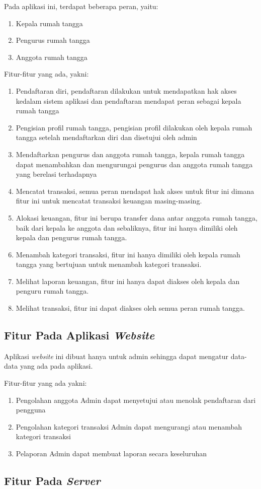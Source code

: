 \hspace{0,5cm}Pada aplikasi ini, terdapat beberapa peran, yaitu:
\begin{enumerate}
	\item Kepala rumah tangga
	\item	Pengurus rumah tangga
	\item Anggota rumah tangga
\end{enumerate}

Fitur-fitur yang ada, yakni:
\begin{enumerate}
	\item Pendaftaran diri, pendaftaran dilakukan untuk mendapatkan hak akses kedalam sistem aplikasi dan pendaftaran mendapat peran sebagai kepala rumah tangga
	\item Pengisian profil rumah tangga, pengisian profil dilakukan oleh kepala rumah tangga setelah mendaftarkan diri dan disetujui oleh admin
	\item	Mendaftarkan pengurus dan anggota rumah tangga, kepala rumah tangga dapat menambahkan dan mengurungai pengurus dan anggota rumah tangga yang berelasi terhadapnya
	\item Mencatat transaksi, semua peran mendapat hak akses untuk fitur ini dimana fitur ini untuk mencatat transaksi keuangan masing-masing.
	\item Alokasi keuangan, fitur ini berupa transfer dana antar anggota rumah tangga, baik dari kepala ke anggota dan sebaliknya, fitur ini hanya dimiliki oleh kepala dan pengurus rumah tangga.
	\item Menambah kategori transaksi, fitur ini hanya dimiliki oleh kepala rumah tangga yang bertujuan untuk menambah kategori transaksi.
	\item Melihat laporan keuangan, fitur ini hanya dapat diakses oleh kepala dan penguru rumah tangga.
	\item Melihat transaksi, fitur ini dapat diakses oleh semua peran rumah tangga.
\end{enumerate}

\subsection{Fitur Pada Aplikasi \textit{Website}}

\hspace{0,5cm}Aplikasi \textit{website} ini dibuat hanya untuk admin sehingga dapat mengatur data-data yang ada pada aplikasi.

Fitur-fitur yang ada yakni:
\begin{enumerate}
	\item Pengolahan anggota
				Admin dapat menyetujui atau menolak pendaftaran dari pengguna
	\item	Pengolahan kategori transaksi
				Admin dapat mengurangi atau menambah kategori transaksi
	\item Pelaporan
				Admin dapat membuat laporan secara keseluruhan
\end{enumerate}

\subsection{Fitur Pada \textit{Server}}